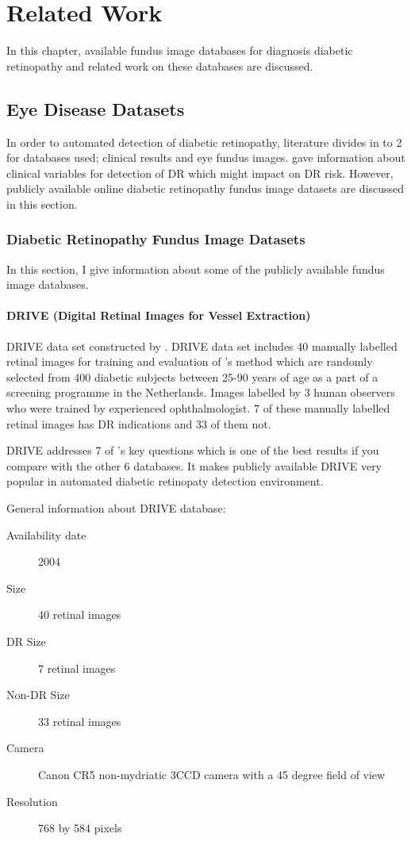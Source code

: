 \chapter{Related Work} 
\label{related_work}

In this chapter, available fundus image databases for diagnosis diabetic retinopathy and related work on these databases are discussed. 

\section{Eye Disease Datasets}
In order to automated detection of diabetic retinopathy, literature divides in to 2 for databases used; clinical results and eye fundus images. \citet{ogunyemi2015machine} gave information about clinical variables for detection of DR which might impact on DR risk. However, publicly available online diabetic retinopathy fundus image datasets are discussed in this section.  

\subsection{Diabetic Retinopathy Fundus Image Datasets}

In this section, I give information about some of the publicly available fundus image databases.

\subsubsection{DRIVE (Digital Retinal Images for Vessel Extraction)}
DRIVE data set constructed by \citet{staal2004ridge}.
DRIVE data set includes 40 manually labelled retinal images for training and evaluation of \citet{staal2004ridge}'s method which are randomly selected from 400 diabetic subjects between 25-90 years of age as a part of a screening programme in the Netherlands. Images labelled by 3 human observers who were trained by experienced ophthalmologist. 7 of these manually labelled retinal images has DR indications and 33 of them not. 

DRIVE addresses 7 of \citet{kauppi2013constructing}'s key questions which is one of the best results if you compare with the other 6 databases. It makes publicly available DRIVE very popular in automated diabetic retinopaty detection environment.

General information about DRIVE database:
\begin{description}
    \item[Availability date] 2004
    \item[Size] 40 retinal images
    \item[DR Size] 7 retinal images
    \item[Non-DR Size] 33 retinal images
    \item[Camera] Canon CR5 non-mydriatic 3CCD camera with a 45 degree field of view
    \item[Resolution] 768 by 584 pixels
\end{description}


